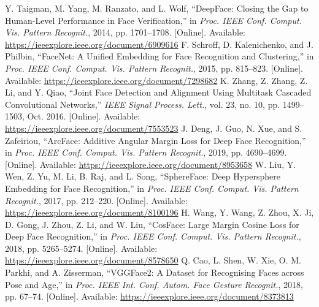 \documentclass[conference]{IEEEtran}
\begin{document}
\begin{thebibliography}{00}
 Y. Taigman, M. Yang, M. Ranzato, and L. Wolf, ``DeepFace: Closing the Gap to Human-Level Performance in Face Verification,'' in \emph{Proc. IEEE Conf. Comput. Vis. Pattern Recognit.}, 2014, pp. 1701--1708. [Online]. Available: \url{https://ieeexplore.ieee.org/document/6909616}
 F. Schroff, D. Kalenichenko, and J. Philbin, ``FaceNet: A Unified Embedding for Face Recognition and Clustering,'' in \emph{Proc. IEEE Conf. Comput. Vis. Pattern Recognit.}, 2015, pp. 815--823. [Online]. Available: \url{https://ieeexplore.ieee.org/document/7298682}
 K. Zhang, Z. Zhang, Z. Li, and Y. Qiao, ``Joint Face Detection and Alignment Using Multitask Cascaded Convolutional Networks,'' \emph{IEEE Signal Process. Lett.}, vol. 23, no. 10, pp. 1499--1503, Oct. 2016. [Online]. Available: \url{https://ieeexplore.ieee.org/document/7553523}
 J. Deng, J. Guo, N. Xue, and S. Zafeiriou, ``ArcFace: Additive Angular Margin Loss for Deep Face Recognition,'' in \emph{Proc. IEEE Conf. Comput. Vis. Pattern Recognit.}, 2019, pp. 4690--4699. [Online]. Available: \url{https://ieeexplore.ieee.org/document/8953658}
 W. Liu, Y. Wen, Z. Yu, M. Li, B. Raj, and L. Song, ``SphereFace: Deep Hypersphere Embedding for Face Recognition,'' in \emph{Proc. IEEE Conf. Comput. Vis. Pattern Recognit.}, 2017, pp. 212--220. [Online]. Available: \url{https://ieeexplore.ieee.org/document/8100196}
 H. Wang, Y. Wang, Z. Zhou, X. Ji, D. Gong, J. Zhou, Z. Li, and W. Liu, ``CosFace: Large Margin Cosine Loss for Deep Face Recognition,'' in \emph{Proc. IEEE Conf. Comput. Vis. Pattern Recognit.}, 2018, pp. 5265--5274. [Online]. Available: \url{https://ieeexplore.ieee.org/document/8578650}
 Q. Cao, L. Shen, W. Xie, O. M. Parkhi, and A. Zisserman, ``VGGFace2: A Dataset for Recognising Faces across Pose and Age,'' in \emph{Proc. IEEE Int. Conf. Autom. Face Gesture Recognit.}, 2018, pp. 67--74. [Online]. Available: \url{https://ieeexplore.ieee.org/document/8373813}
\end{thebibliography}
\end{document}
